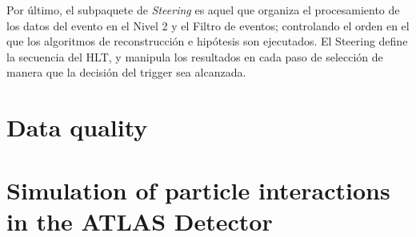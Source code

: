   Por \'ultimo, el subpaquete de \emph{Steering} es aquel que organiza el procesamiento de los datos del evento en el Nivel 2 y el Filtro de eventos; controlando el orden en el que los algoritmos de reconstrucci\'on e hip\'otesis son ejecutados. El Steering define la secuencia del HLT, y manipula los resultados en cada paso de selecci\'on de manera que la decisi\'on del trigger sea alcanzada.


\section{Data quality}\label{sec:atlasSim}

\section{Simulation of particle interactions in the ATLAS Detector}\label{sec:atlasSim}



